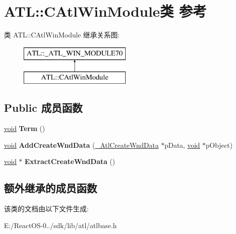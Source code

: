 \hypertarget{class_a_t_l_1_1_c_atl_win_module}{}\section{A\+TL\+:\+:C\+Atl\+Win\+Module类 参考}
\label{class_a_t_l_1_1_c_atl_win_module}
类 A\+TL\+:\+:C\+Atl\+Win\+Module 继承关系图\+:\begin{figure}[H]
\begin{center}
\leavevmode
\includegraphics[height=2.000000cm]{class_a_t_l_1_1_c_atl_win_module}
\end{center}
\end{figure}
\subsection*{Public 成员函数}
\begin{DoxyCompactItemize}
\item 
\mbox{\label{class_a_t_l_1_1_c_atl_win_module_ae0eb91a444ae3a3024b2ba14219993bd}} 
\hyperlink{interfacevoid}{void} {\bfseries Term} ()
\item 
\mbox{\label{class_a_t_l_1_1_c_atl_win_module_a0945f15496cb6b57f39f6bb900b4a571}} 
\hyperlink{interfacevoid}{void} {\bfseries Add\+Create\+Wnd\+Data} (\hyperlink{struct_a_t_l_1_1___atl_create_wnd_data}{\+\_\+\+Atl\+Create\+Wnd\+Data} $\ast$p\+Data, \hyperlink{interfacevoid}{void} $\ast$p\+Object)
\item 
\mbox{\label{class_a_t_l_1_1_c_atl_win_module_adceb15dbe10bd1ba2d829f3b1bf2ed30}} 
\hyperlink{interfacevoid}{void} $\ast$ {\bfseries Extract\+Create\+Wnd\+Data} ()
\end{DoxyCompactItemize}
\subsection*{额外继承的成员函数}


该类的文档由以下文件生成\+:\begin{DoxyCompactItemize}
\item 
E\+:/\+React\+O\+S-\/0../sdk/lib/atl/atlbase.\+h\end{DoxyCompactItemize}
